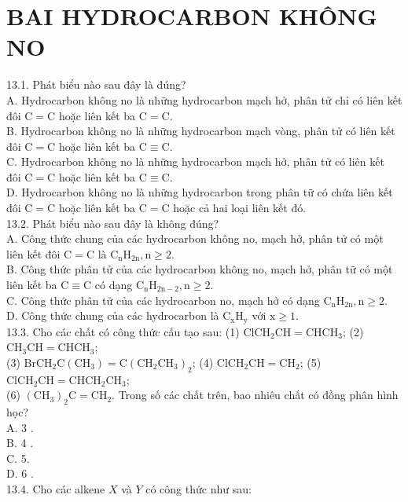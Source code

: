 \documentclass[10pt]{article}
\begin{document}
\section*{BAI HYDROCARBON KHÔNG NO}
13.1. Phát biểu nào sau đây là đúng?\\
A. Hydrocarbon không no là những hydrocarbon mạch hở, phân tử chỉ có liên kết đôi $\mathrm{C}=\mathrm{C}$ hoặc liên kết ba $\mathrm{C}=\mathrm{C}$.\\
B. Hydrocarbon không no là những hydrocarbon mạch vòng, phân tử có liên kết đôi $\mathrm{C}=\mathrm{C}$ hoặc liên kết ba $\mathrm{C} \equiv \mathrm{C}$.\\
C. Hydrocarbon không no là những hydrocarbon mạch hở, phân tử có liên kết đôi $\mathrm{C}=\mathrm{C}$ hoặc liên kết ba $\mathrm{C} \equiv \mathrm{C}$.\\
D. Hydrocarbon không no là những hydrocarbon trong phân tữ có chứa liên kết đôi $\mathrm{C}=\mathrm{C}$ hoặc liên kết ba $\mathrm{C}=\mathrm{C}$ hoặc cả hai loại liên kết đó.\\
13.2. Phát biểu nào sau đây là không đúng?\\
A. Công thức chung của các hydrocarbon không no, mạch hở, phân tử có một liên kết đôi $\mathrm{C}=\mathrm{C}$ là $\mathrm{C}_{\mathrm{n}} \mathrm{H}_{2 \mathrm{n}}, \mathrm{n} \geq 2$.\\
B. Công thức phân tử của các hydrocarbon không no, mạch hở, phân tữ có một liên kết ba $\mathrm{C} \equiv \mathrm{C}$ có dạng $\mathrm{C}_{\mathrm{n}} \mathrm{H}_{2 \mathrm{n}-2}, \mathrm{n} \geq 2$.\\
C. Công thức phân tử của các hydrocarbon no, mạch hở có dạng $\mathrm{C}_{\mathrm{n}} \mathrm{H}_{2 \mathrm{n}}, \mathrm{n} \geq 2$.\\
D. Công thức chung của các hydrocarbon là $\mathrm{C}_{\mathrm{x}} \mathrm{H}_{\mathrm{y}}$ với $\mathrm{x} \geq 1$.\\
13.3. Cho các chất có công thức cấu tạo sau: (1) $\mathrm{ClCH}_{2} \mathrm{CH}=\mathrm{CHCH}_{3}$; (2) $\mathrm{CH}_{3} \mathrm{CH}=\mathrm{CHCH}_{3}$;\\
(3) $\mathrm{BrCH}_{2} \mathrm{C}\left(\mathrm{CH}_{3}\right)=\mathrm{C}\left(\mathrm{CH}_{2} \mathrm{CH}_{3}\right)_{2}$; (4) $\mathrm{ClCH}_{2} \mathrm{CH}=\mathrm{CH}_{2}$; (5) $\mathrm{ClCH}_{2} \mathrm{CH}=\mathrm{CHCH}_{2} \mathrm{CH}_{3}$;\\
(6) $\left(\mathrm{CH}_{3}\right)_{2} \mathrm{C}=\mathrm{CH}_{2}$. Trong số các chất trên, bao nhiêu chất có đồng phân hình học?\\
A. 3 .\\
B. 4 .\\
C. 5.\\
D. 6 .\\
13.4. Cho các alkene $X$ và $Y$ có công thức như sau:
\end{document}
